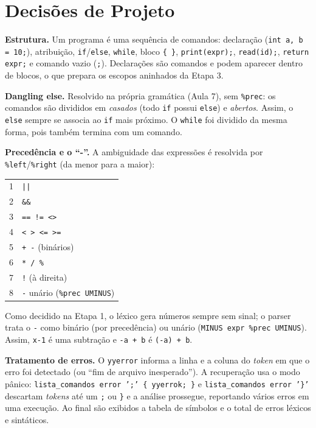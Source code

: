 \documentclass[sigconf,nonacm]{acmart}
\begin{document}
\section{Decisões de Projeto}\label{sec:decisoes}
\textbf{Estrutura.} Um programa é uma sequência de comandos: declaração
(\texttt{int a, b = 10;}), atribuição, \texttt{if}/\texttt{else}, \texttt{while}, bloco
\texttt{\{ \}}, \texttt{print(expr);}, \texttt{read(id);}, \texttt{return expr;} e comando
vazio (\texttt{;}). Declarações são comandos e podem aparecer dentro de blocos, o que
prepara os escopos aninhados da Etapa 3.

\textbf{Dangling else.} Resolvido na própria gramática (Aula 7), sem \texttt{\%prec}: os
comandos são divididos em \emph{casados} (todo \texttt{if} possui \texttt{else}) e
\emph{abertos}. Assim, o \texttt{else} sempre se associa ao \texttt{if} mais próximo. O
\texttt{while} foi dividido da mesma forma, pois também termina com um comando.

\textbf{Precedência e o ``-''.} A ambiguidade das expressões é resolvida por
\texttt{\%left}/\texttt{\%right} (da menor para a maior):

\begin{center}\small
\begin{tabular}{cl}
\hline
1 & \texttt{||} \\
2 & \texttt{\&\&} \\
3 & \texttt{== != <>} \\
4 & \texttt{< > <= >=} \\
5 & \texttt{+ -} (binários) \\
6 & \texttt{* / \%} \\
7 & \texttt{!} (à direita) \\
8 & \texttt{-} unário (\texttt{\%prec UMINUS}) \\
\hline
\end{tabular}
\end{center}

Como decidido na Etapa 1, o léxico gera números sempre sem sinal; o parser trata o
\texttt{-} como binário (por precedência) ou unário (\texttt{MINUS expr \%prec UMINUS}).
Assim, \texttt{x-1} é uma subtração e \texttt{-a + b} é \texttt{(-a) + b}.

\textbf{Tratamento de erros.} O \texttt{yyerror} informa a linha e a coluna do
\emph{token} em que o erro foi detectado (ou ``fim de arquivo inesperado''). A
recuperação usa o modo pânico: \texttt{lista\_comandos error ';' \{ yyerrok; \}} e
\texttt{lista\_comandos error '\}'} descartam \emph{tokens} até um \texttt{;} ou
\texttt{\}} e a análise prossegue, reportando vários erros em uma execução. Ao final
são exibidos a tabela de símbolos e o total de erros léxicos e sintáticos.
\end{document}
